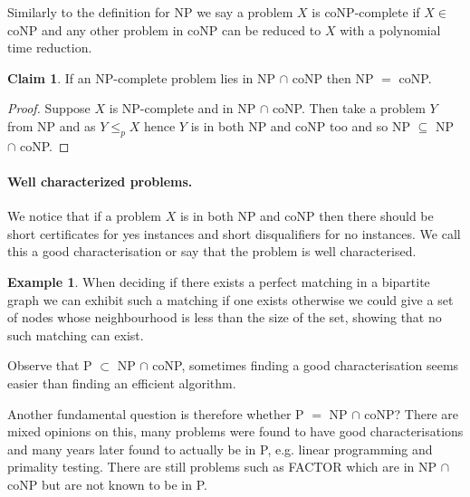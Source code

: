 \documentclass[11pt,a4paper]{article}
\theoremstyle{definition}
\newtheorem{claim}{Claim}
\newtheorem*{ex}{Example}
\begin{document}
Similarly to the definition for NP we say a problem $X$ is coNP-complete if $X \in $ coNP and any other problem in coNP can be reduced to $X$ with a polynomial time reduction.

\begin{claim}
If an NP-complete problem lies in NP $\cap$ coNP then NP $=$ coNP. %
\end{claim}
\begin{proof}
Suppose $X$ is NP-complete and in NP $\cap$ coNP.
Then take a problem $Y$ from NP and as $Y \le_p X$ hence $Y$ is in both NP and coNP too and so NP $\subseteq$ NP $\cap$ coNP.
\end{proof}

\paragraph{Well characterized problems.}
We notice that if a problem $X$ is in both NP and coNP then there should be short certificates for yes instances and short disqualifiers for no instances.
We call this a good characterisation or say that the problem is well characterised.

\begin{ex}
When deciding if there exists a perfect matching in a bipartite graph we can exhibit such a matching if one exists otherwise we could give a set of nodes whose neighbourhood is less than the size of the set, showing that no such matching can exist.
\end{ex}

Observe that P $\subset$ NP $\cap$ coNP, sometimes finding a good characterisation seems easier than finding an efficient algorithm.

Another fundamental question is therefore whether P $=$ NP $\cap$ coNP?
There are mixed opinions on this, many problems were found to have good characterisations and many years later found to actually be in P, e.g. linear programming and primality testing.
There are still problems such as FACTOR which are in NP $\cap$ coNP but are not known to be in P.
\end{document}
